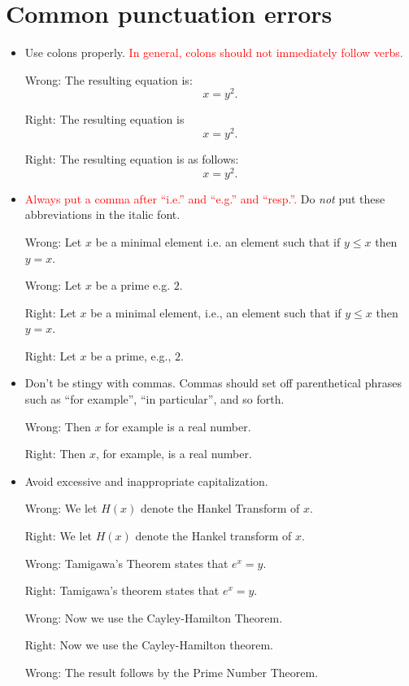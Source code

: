 \documentclass[12pt]{article}
\begin{document}
\section{Common punctuation errors}

\begin{itemize}

\item  Use colons properly.  
\textcolor{red}{In general, colons should not immediately follow
verbs.}

Wrong:  The resulting equation is:
$$ x = y^2 .$$

Right:  The resulting equation is
$$ x = y^2 .$$

Right:  The resulting equation is as follows:
$$ x = y^2.$$


\item  \textcolor{red}{Always put a comma after ``i.e.'' and ``e.g.''
and ``resp.''.}
Do {\it not\/} put these abbreviations in the italic font.

Wrong:  Let $x$ be a minimal element i.e. an element such
that if $y \leq x$ then $y = x$.

Wrong:  Let $x$ be a prime e.g. $2$. 

Right:  Let $x$ be a minimal element, i.e., an element such
that if $y \leq x$ then $y = x$.

Right:  Let $x$ be a prime, e.g., $2$.

\item Don't be stingy with commas.  Commas should set off 
parenthetical phrases such as ``for example'', ``in particular'',
and so forth.

Wrong:  Then $x$ for example is a real number.

Right:  Then $x$, for example, is a real number.

\item Avoid excessive and inappropriate capitalization.

Wrong:  We let $H(x)$ denote the Hankel Transform of $x$.

Right:  We let $H(x)$ denote the Hankel transform of $x$.

Wrong:  Tamigawa's Theorem states that $e^x = y$.

Right:  Tamigawa's theorem states that $e^x = y$.

Wrong:  Now we use the Cayley-Hamilton Theorem.

Right:  Now we use the Cayley-Hamilton theorem.

Wrong:  The result follows by the Prime Number Theorem.


\end{itemize}
\end{document}
